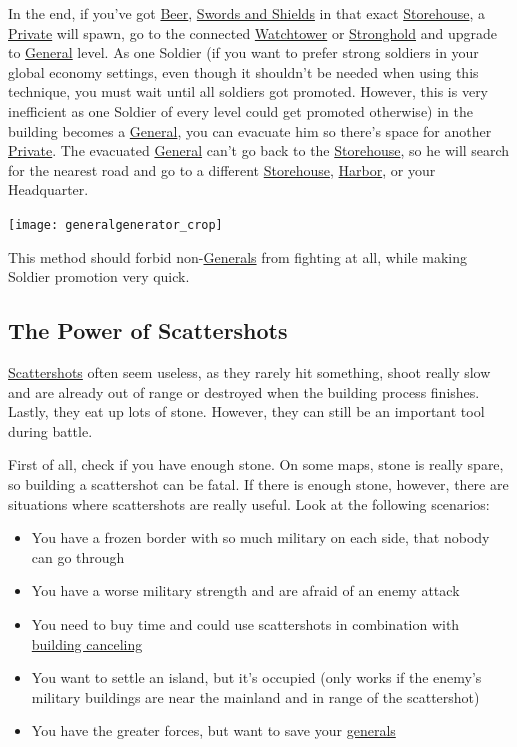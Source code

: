 \documentclass[12pt]{article}
\begin{document}
In the end, if you've got \hyperref[sec:brewery]{Beer}, \hyperref[sec:smithy]{Swords and Shields} in that exact \hyperref[sec:storehouse]{Storehouse}, a \hyperref[sec:private]{Private} will spawn, go to the connected \hyperref[sec:watchtower]{Watchtower} or \hyperref[sec:stronghold]{Stronghold} and upgrade to \hyperref[sec:general]{General} level. As one Soldier (if you want to prefer strong soldiers in your global economy settings, even though it shouldn't be needed when using this technique, you must wait until all soldiers got promoted. However, this is very inefficient as one Soldier of every level could get promoted otherwise) in the building becomes a \hyperref[sec:general]{General}, you can evacuate him so there's space for another \hyperref[sec:private]{Private}. The evacuated \hyperref[sec:general]{General} can't go back to the \hyperref[sec:storehouse]{Storehouse}, so he will search for the nearest road and go to a different \hyperref[sec:storehouse]{Storehouse}, \hyperref[sec:harbor]{Harbor}, or your Headquarter.

\vspace{0.5cm}
\texttt{[image: generalgenerator\_crop]}
\vspace{0.5cm}

This method should forbid non-\hyperref[sec:general]{Generals} from fighting at all, while making Soldier promotion very quick.

\subsection{The Power of Scattershots}
\label{sec:powerofscattershots}

\hyperref[sec:scattershot]{Scattershots} often seem useless, as they rarely hit something, shoot really slow and are already out of range or destroyed when the building process finishes. Lastly, they eat up lots of stone. However, they can still be an important tool during battle.

First of all, check if you have enough stone. On some maps, stone is really spare, so building a scattershot can be fatal. If there is enough stone, however, there are situations where scattershots are really useful. Look at the following scenarios:

\begin{itemize}
    \item You have a frozen border with so much military on each side, that nobody can go through
    \item You have a worse military strength and are afraid of an enemy attack
    \item You need to buy time and could use scattershots in combination with \hyperref[sec:buildingcanceling]{building canceling}
    \item You want to settle an island, but it's occupied (only works if the enemy's military buildings are near the mainland and in range of the scattershot)
    \item You have the greater forces, but want to save your \hyperref[sec:general]{generals}
\end{itemize}
\end{document}
